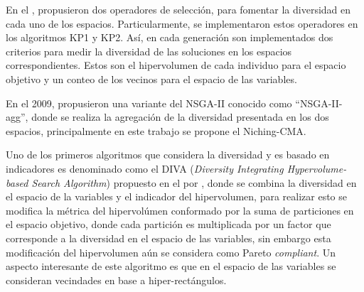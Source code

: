 En el \citeyear{chan2005evolutionary}, \citeauthor{chan2005evolutionary} propusieron dos operadores de selección, para fomentar la diversidad en cada uno de los espacios.
%
Particularmente, se implementaron estos operadores en los algoritmos KP1 y KP2.
%
Así, en cada generación son implementados dos criterios para medir la diversidad de las soluciones en los espacios correspondientes.
%
%
%
Estos son el hipervolumen de cada individuo para el espacio objetivo y un conteo de los vecinos para el espacio de las variables.
%

En el 2009, \citeauthor{shir2009enhancing} propusieron una variante del NSGA-II conocido como ``NSGA-II-agg'', donde se realiza la agregación de la diversidad presentada en los dos espacios, principalmente en este trabajo se propone el Niching-CMA.
%
%

Uno de los primeros algoritmos que considera la diversidad y es basado en indicadores es denominado como el DIVA (\textit{Diversity Integrating Hypervolume-based Search Algorithm}) propuesto en el \citeyear{ulrich2010integrating} por \citeauthor{ulrich2010integrating}, donde se combina la diversidad en el espacio de la variables y el indicador del hipervolumen, para realizar esto se modifica la métrica del hipervolúmen conformado por la suma de particiones en el espacio objetivo, donde cada partición es multiplicada por un factor que corresponde a la diversidad en el espacio de las variables, sin embargo esta modificación del hipervolumen aún se considera como Pareto \textit{compliant}.
%
Un aspecto interesante de este algoritmo es que en el espacio de las variables se consideran vecindades en base a hiper-rectángulos.

